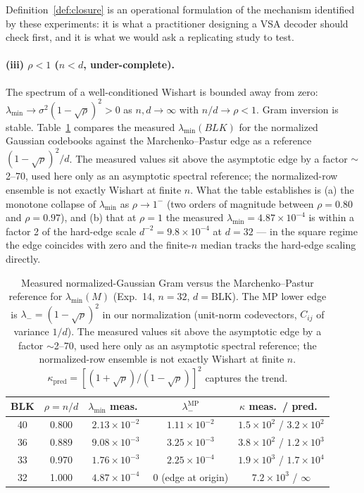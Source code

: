 \documentclass[11pt,a4paper]{article}
\begin{document}
Definition~\ref{def:closure} is an operational formulation of the mechanism identified by these experiments: it is what a practitioner designing a VSA decoder should check first, and it is what we would ask a replicating study to test.

\paragraph{(iii) $\rho < 1$ ($n < d$, under-complete).} The spectrum of a well-conditioned Wishart is bounded away from zero: $\lambda_{\min} \to \sigma^{2}(1-\sqrt{\rho})^{2} > 0$ as $n,d \to \infty$ with $n/d \to \rho < 1$. Gram inversion is stable. Table~\ref{tab:wishart-check} compares the measured $\lambda_{\min}(BLK)$ for the normalized Gaussian codebooks against the Marchenko--Pastur edge as a reference $(1-\sqrt{\rho})^{2}/d$. The measured values sit above the asymptotic edge by a factor $\sim$2--70, used here only as an asymptotic spectral reference; the normalized-row ensemble is not exactly Wishart at finite $n$. What the table establishes is (a) the monotone collapse of $\lambda_{\min}$ as $\rho \to 1^{-}$ (two orders of magnitude between $\rho=0.80$ and $\rho=0.97$), and (b) that at $\rho=1$ the measured $\lambda_{\min} = 4.87 \times 10^{-4}$ is within a factor 2 of the hard-edge scale $d^{-2} = 9.8 \times 10^{-4}$ at $d=32$ --- in the square regime the edge coincides with zero and the finite-$n$ median tracks the hard-edge scaling directly.

\begin{table}[t]
  \centering
  \caption{Measured normalized-Gaussian Gram versus the Marchenko--Pastur reference for $\lambda_{\min}(M)$ (Exp.~14, $n=32$, $d=\mathrm{BLK}$). The MP lower edge is $\lambda_{-}=(1-\sqrt{\rho})^{2}$ in our normalization (unit-norm codevectors, $C_{ij}$ of variance $1/d$). The measured values sit above the asymptotic edge by a factor $\sim$2--70, used here only as an asymptotic spectral reference; the normalized-row ensemble is not exactly Wishart at finite $n$. $\kappa_{\text{pred}} = [(1+\sqrt{\rho})/(1-\sqrt{\rho})]^{2}$ captures the trend.}
  \label{tab:wishart-check}
  \begin{tabular}{ccccc}
    \toprule
    BLK & $\rho=n/d$ & $\lambda_{\min}$ meas.\ & $\lambda_{-}^{\mathrm{MP}}$ & $\kappa$ meas.\ / pred.\ \\
    \midrule
    40 & 0.800 & $2.13\times10^{-2}$ & $1.11\times10^{-2}$ & $1.5\times10^{2}$ / $3.2\times10^{2}$ \\
    36 & 0.889 & $9.08\times10^{-3}$ & $3.25\times10^{-3}$ & $3.8\times10^{2}$ / $1.2\times10^{3}$ \\
    33 & 0.970 & $1.76\times10^{-3}$ & $2.25\times10^{-4}$ & $1.9\times10^{3}$ / $1.7\times10^{4}$ \\
    32 & 1.000 & $4.87\times10^{-4}$ & $0$ (edge at origin) & $7.2\times10^{3}$ / $\infty$ \\
    \bottomrule
  \end{tabular}
\end{table}
\end{document}
